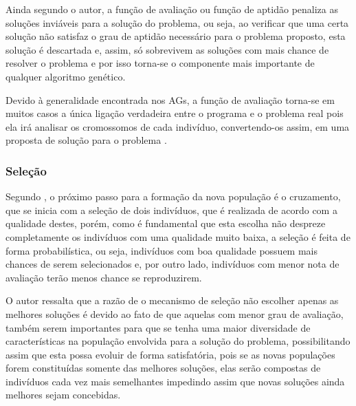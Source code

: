 \par Ainda segundo o autor, a função de avaliação ou função de aptidão penaliza
as soluções inviáveis para a solução do problema, ou seja, ao verificar que uma
certa solução não satisfaz o grau de aptidão necessário para o problema
proposto, esta solução é descartada e, assim, só sobrevivem as soluções com mais
chance de resolver o problema e por isso torna-se o componente mais importante de qualquer algoritmo genético.

\par Devido à generalidade encontrada nos AGs, a função de avaliação
torna-se em muitos casos a única ligação verdadeira entre o programa e o
problema real pois ela irá analisar os cromossomos de cada indivíduo,
convertendo-os assim, em uma proposta de solução para o problema
\cite{livro_ags_ricardo_linden}.



\subsubsection{Seleção}

\par Segundo , o próximo passo
para a formação da nova população é o cruzamento, que se inicia com a seleção de
dois indivíduos, que é realizada de acordo com a qualidade destes, porém,
como é fundamental que esta escolha não despreze completamente os indivíduos com uma
qualidade muito baixa, a seleção é feita de forma probabilística, ou seja,
indivíduos com boa qualidade possuem mais chances de serem selecionados e, por
outro lado, indivíduos com menor nota de avaliação terão menos chance se
reproduzirem.

\par O autor ressalta que a razão de o mecanismo de seleção não
escolher apenas as melhores soluções é devido ao fato de que aquelas com menor
grau de avaliação, também serem importantes para que se tenha uma maior diversidade de características
na população envolvida para a solução do problema, possibilitando assim
que esta possa evoluir de forma satisfatória, pois se as novas populações forem constituídas
somente das melhores soluções, elas serão compostas de indivíduos cada vez mais semelhantes
impedindo assim que novas soluções ainda melhores sejam concebidas.

